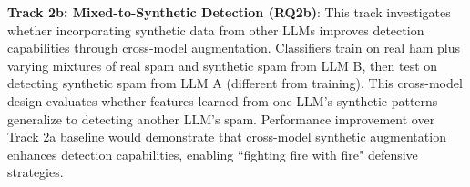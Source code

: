 \textbf{Track 2b: Mixed-to-Synthetic Detection (RQ2b)}: This track investigates whether incorporating synthetic data from other LLMs improves detection capabilities through cross-model augmentation. Classifiers train on real ham plus varying mixtures of real spam and synthetic spam from LLM B, then test on detecting synthetic spam from LLM A (different from training). This cross-model design evaluates whether features learned from one LLM's synthetic patterns generalize to detecting another LLM's spam. Performance improvement over Track 2a baseline would demonstrate that cross-model synthetic augmentation enhances detection capabilities, enabling ``fighting fire with fire" defensive strategies.
